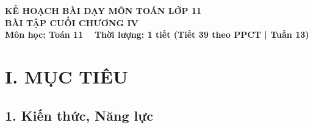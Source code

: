 \documentclass[12pt, a4paper]{article}
\begin{document}
\begin{center}
    {\fontsize{14pt}{17pt}\selectfont \textbf{KẾ HOẠCH BÀI DẠY MÔN TOÁN LỚP 11}}\\[6pt]
    {\fontsize{16pt}{19pt}\selectfont \textbf{BÀI TẬP CUỐI CHƯƠNG IV}}\\[4pt]
    {\fontsize{12pt}{15pt}\selectfont \textbf{Môn học: Toán 11} \ \textbar \ \textbf{Thời lượng: 1 tiết (Tiết 39 theo PPCT | Tuần 13)}}
\end{center}

\vspace{5pt}

\section*{I. MỤC TIÊU}

\subsection*{1. Kiến thức, Năng lực}
\end{document}
